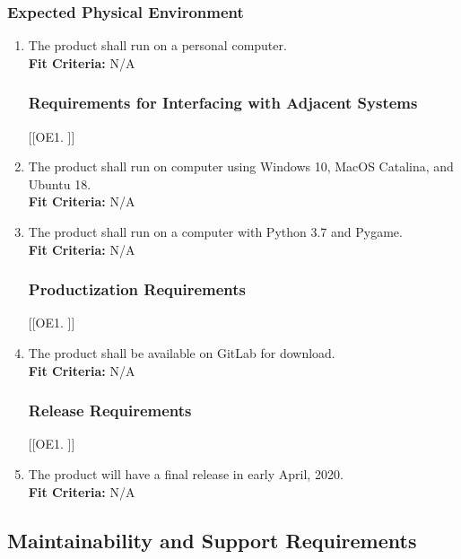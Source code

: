 \documentclass[12pt, titlepage]{article}
\begin{document}
\subsubsection{Expected Physical Environment}
\begin{enumerate}[{OE}1. ]
    \item The product shall run on a personal computer.\\
    \textbf{Fit Criteria:} N/A

\subsubsection{Requirements for Interfacing with Adjacent Systems}
[{[{OE}1. ]}]
    \item The product shall run on computer using Windows 10, MacOS Catalina, and Ubuntu 18.\\
    \textbf{Fit Criteria:} N/A
    \item The product shall run on a computer with Python 3.7 and Pygame.\\
    \textbf{Fit Criteria:} N/A

\subsubsection{Productization Requirements}
[{[{OE}1. ]}]
    \item The product shall be available on GitLab for download.\\
    \textbf{Fit Criteria:} N/A

\subsubsection{Release Requirements}
[{[{OE}1. ]}]
    \item The product will have a final release in early April, 2020.\\
    \textbf{Fit Criteria:} N/A
\end{enumerate}



\subsection{Maintainability and Support Requirements}
\end{document}
